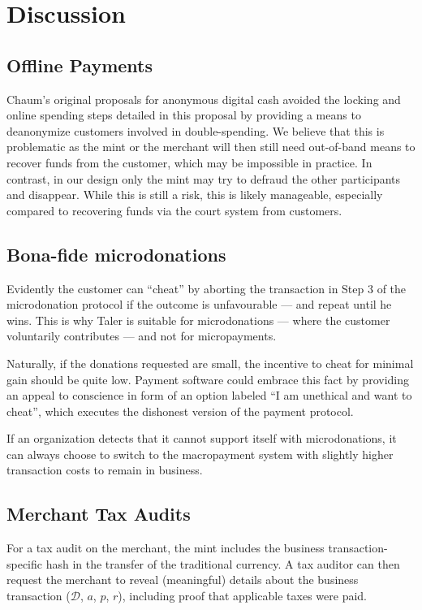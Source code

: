\documentclass{llncs}
\begin{document}
\section{Discussion}

\subsection{Offline Payments}

Chaum's original proposals for anonymous digital cash avoided the
locking and online spending steps detailed in this proposal by
providing a means to deanonymize customers involved in
double-spending.  We believe that this is problematic as the mint or
the merchant will then still need out-of-band means to recover funds
from the customer, which may be impossible in practice.  In contrast,
in our design only the mint may try to defraud the other participants
and disappear.  While this is still a risk, this is likely manageable,
especially compared to recovering funds via the court system from
customers.


\subsection{Bona-fide microdonations}

Evidently the customer can ``cheat'' by aborting the transaction in
Step 3 of the microdonation protocol if the outcome is unfavourable ---
and repeat until he wins.  This is why Taler is suitable for
microdonations --- where the customer voluntarily contributes ---
and not for micropayments.

Naturally, if the donations requested are small, the incentive to
cheat for minimal gain should be quite low.  Payment software could
embrace this fact by providing an appeal to conscience in form of an
option labeled ``I am unethical and want to cheat'', which executes
the dishonest version of the payment protocol.

If an organization detects that it cannot support itself with
microdonations, it can always choose to switch to the macropayment
system with slightly higher transaction costs to remain in business.

\subsection{Merchant Tax Audits}

For a tax audit on the merchant, the mint includes the business
transaction-specific hash in the transfer of the traditional
currency.  A tax auditor can then request the merchant to reveal
(meaningful) details about the business transaction ($\mathcal{D}$,
$a$, $p$, $r$), including proof that applicable taxes were paid.
\end{document}
